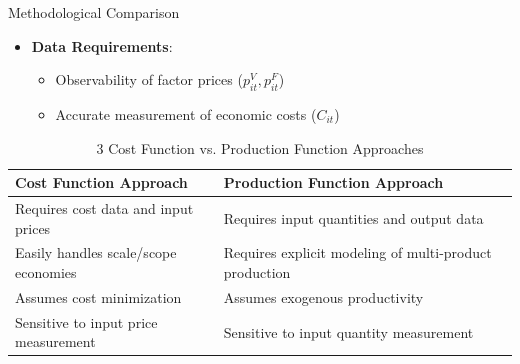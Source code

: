 \documentclass[aspectratio=169]{beamer}  %
\begin{document}
\begin{frame}{Methodological Comparison}
    
\begin{itemize} 
    \item \textbf{Data Requirements}:
    \begin{itemize}
        \item Observability of factor prices (\(p^V_{it}, p^F_{it}\))
        \item Accurate measurement of economic costs (\(C_{it}\))
    \end{itemize}
\end{itemize}

\begin{table}[h]
\centering
\caption{3 Cost Function vs. Production Function Approaches}
\begin{tabular}{p{}p{}}
\toprule
\textbf{Cost Function Approach} & \textbf{Production Function Approach} \\
\midrule
Requires cost data and input prices & Requires input quantities and output data \\
Easily handles scale/scope economies & Requires explicit modeling of multi-product production \\
Assumes cost minimization & Assumes exogenous productivity \\
Sensitive to input price measurement & Sensitive to input quantity measurement \\
\bottomrule
\end{tabular}
\end{table}
\end{frame}
\end{document}
